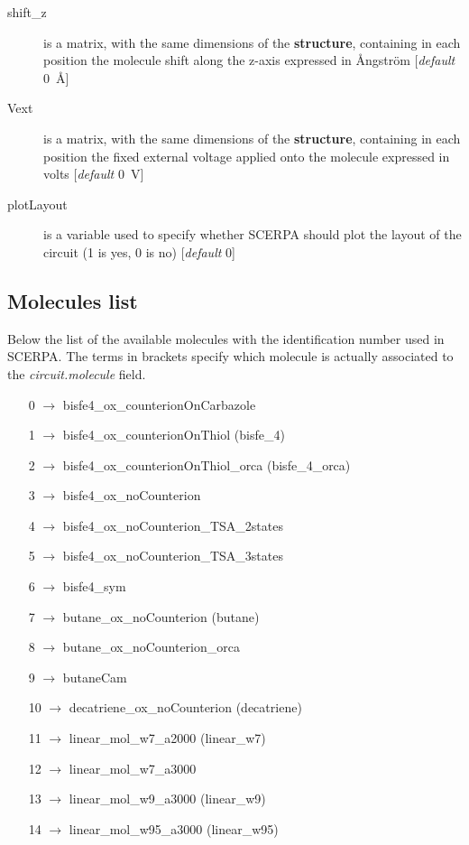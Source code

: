 \documentclass[a4paper,10pt]{article}
\begin{document}
\begin{description}
\item[shift\_z] is a matrix, with the same dimensions of the \textbf{structure}, containing in each position the molecule shift along the z-axis expressed in \r{A}ngstr\"{o}m [\textit{default} 0~\AA]

\item[Vext] is a matrix, with the same dimensions of the \textbf{structure}, containing in each position the fixed external voltage applied onto the molecule expressed in volts [\textit{default} 0~V]

\item[plotLayout] is a variable used to specify whether SCERPA should plot the layout of the circuit (1 is yes, 0 is no) [\textit{default} 0] 

\end{description}


\subsection*{Molecules list}
\noindent Below the list of the available molecules with the identification number used in SCERPA. The terms in brackets specify which molecule is actually associated to the \textit{circuit.molecule} field. 
\begin{itemize}
\item[0 ] $\longrightarrow$  bisfe4\_ox\_counterionOnCarbazole
\item[1 ] $\longrightarrow$  bisfe4\_ox\_counterionOnThiol (bisfe\_4)
\item[2 ] $\longrightarrow$  bisfe4\_ox\_counterionOnThiol\_orca (bisfe\_4\_orca)
\item[3 ] $\longrightarrow$  bisfe4\_ox\_noCounterion
\item[4 ] $\longrightarrow$  bisfe4\_ox\_noCounterion\_TSA\_2states
\item[5 ] $\longrightarrow$  bisfe4\_ox\_noCounterion\_TSA\_3states
\item[6 ] $\longrightarrow$  bisfe4\_sym
\item[7 ] $\longrightarrow$  butane\_ox\_noCounterion (butane)
\item[8 ] $\longrightarrow$  butane\_ox\_noCounterion\_orca
\item[9 ] $\longrightarrow$  butaneCam
\item[10] $\longrightarrow$  decatriene\_ox\_noCounterion (decatriene)
\item[11] $\longrightarrow$  linear\_mol\_w7\_a2000 (linear\_w7)
\item[12] $\longrightarrow$  linear\_mol\_w7\_a3000
\item[13] $\longrightarrow$  linear\_mol\_w9\_a3000 (linear\_w9)
\item[14] $\longrightarrow$  linear\_mol\_w95\_a3000 (linear\_w95)
\end{itemize}
\end{document}
